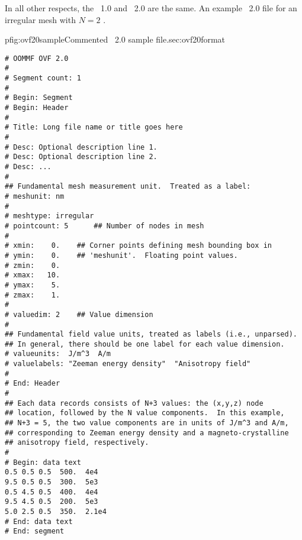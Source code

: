In all other respects, the \OVF~1.0 and \OVF~2.0 are the same.  An
example \OVF~2.0 file for an irregular mesh with $N=2$
.

\begin{codelisting}{p}{fig:ovf20sample}{Commented \OVF~2.0 sample
file.}{sec:ovf20format}
\begin{verbatim}
# OOMMF OVF 2.0
#
# Segment count: 1
#
# Begin: Segment
# Begin: Header
#
# Title: Long file name or title goes here
#
# Desc: Optional description line 1.
# Desc: Optional description line 2.
# Desc: ...
#
## Fundamental mesh measurement unit.  Treated as a label:
# meshunit: nm
#
# meshtype: irregular
# pointcount: 5      ## Number of nodes in mesh
#
# xmin:    0.    ## Corner points defining mesh bounding box in
# ymin:    0.    ## 'meshunit'.  Floating point values.
# zmin:    0.
# xmax:   10.
# ymax:    5.
# zmax:    1.
#
# valuedim: 2    ## Value dimension
#
## Fundamental field value units, treated as labels (i.e., unparsed).
## In general, there should be one label for each value dimension.
# valueunits:  J/m^3  A/m
# valuelabels: "Zeeman energy density"  "Anisotropy field"
#
# End: Header
#
## Each data records consists of N+3 values: the (x,y,z) node
## location, followed by the N value components.  In this example,
## N+3 = 5, the two value components are in units of J/m^3 and A/m,
## corresponding to Zeeman energy density and a magneto-crystalline
## anisotropy field, respectively.
#
# Begin: data text
0.5 0.5 0.5  500.  4e4
9.5 0.5 0.5  300.  5e3
0.5 4.5 0.5  400.  4e4
9.5 4.5 0.5  200.  5e3
5.0 2.5 0.5  350.  2.1e4
# End: data text
# End: segment
\end{verbatim}
\end{codelisting}


